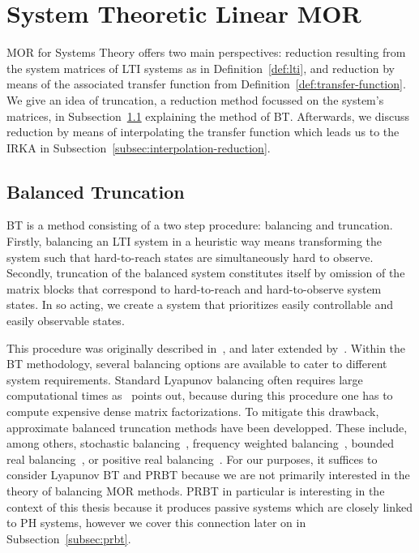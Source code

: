 \section{System Theoretic Linear MOR}\label{sec:system-mor}

\acl{MOR} for Systems Theory offers two main perspectives: reduction resulting from the system matrices of \ac{LTI} systems as in Definition~\ref{def:lti}, and reduction by means of the associated transfer function from Definition~\ref{def:transfer-function}.
We give an idea of truncation, a reduction method focussed on the system's matrices, in Subsection~\ref{subsec:balanced-truncation} explaining the method of \acf{BT}.
Afterwards, we discuss reduction by means of interpolating the transfer function which leads us to the \acf{IRKA} in Subsection~\ref{subsec:interpolation-reduction}.

\subsection{Balanced Truncation}\label{subsec:balanced-truncation}

\acl{BT} is a method consisting of a two step procedure: balancing and truncation.
Firstly, balancing an \ac{LTI} system in a heuristic way means transforming the system such that hard-to-reach states are simultaneously hard to observe.
Secondly, truncation of the balanced system constitutes itself by omission of the matrix blocks that correspond to hard-to-reach and hard-to-observe system states.
In so acting, we create a system that prioritizes easily controllable and easily observable states.

This procedure was originally described in~\cite{Mullis1976}, and later extended by~\cite{Moore1981, Enns1984}.
Within the \ac{BT} methodology, several balancing options are available to cater to different system requirements.
Standard Lyapunov balancing often requires large computational times as~\cite{Gugercin2007} points out, because during this procedure one has to compute expensive dense matrix factorizations.
To mitigate this drawback, approximate balanced truncation methods have been developped.
These include, among others, stochastic balancing~\cite{Desai1984, Green1988}, frequency weighted balancing~\cite{Enns1984, Wang1999}, bounded real balancing~\cite{Opdenacker1988, Reis2010}, or positive real balancing~\cite{Desai1984, Ober1991}.
For our purposes, it suffices to consider Lyapunov \ac{BT} and \ac{PRBT} because we are not primarily interested in the theory of balancing \ac{MOR} methods.
\ac{PRBT} in particular is interesting in the context of this thesis because it produces passive systems which are closely linked to \ac{PH} systems, however we cover this connection later on in Subsection~\ref{subsec:prbt}.

